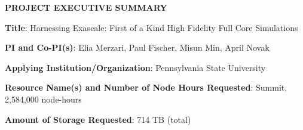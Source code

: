 \documentclass[11pt,letterpaper,english]{article}
\begin{document}
\setlength{\parindent}{0in} %

\pagestyle{fancy}   \renewcommand{%
\headrulewidth}{0.0pt}

\begin{center}
\bf {PROJECT EXECUTIVE SUMMARY} \\
\end{center}




\bigskip

\textbf{Title}: Harnessing Exascale: First of a Kind High Fidelity Full Core Simulations \smallskip

\textbf{PI and Co-PI(s)}: Elia Merzari, Paul Fischer, Misun Min, April Novak \smallskip

\textbf{Applying Institution/Organization}: Pennsylvania State University \smallskip

\textbf{Resource Name(s) and Number of Node Hours Requested}: Summit, 2,584,000 node-hours \smallskip

\textbf{Amount of Storage Requested}: 714 TB (total) \smallskip
\end{document}
